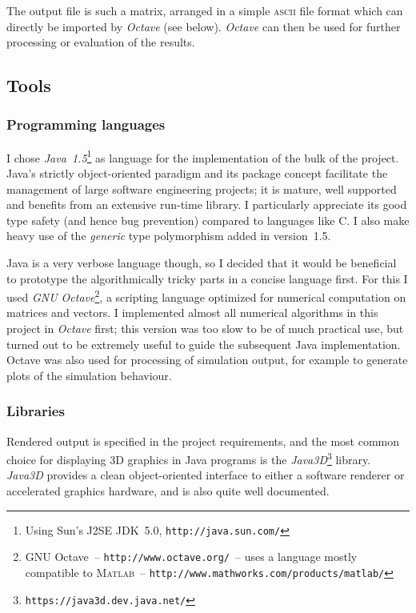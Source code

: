 The output file is such a matrix, arranged in a simple \textsc{ascii} file format which can
directly be imported by \textsl{Octave} (see below). \textsl{Octave} can then be used for further
processing or evaluation of the results.

\subsection{Tools\label{softwareTools}}
\subsubsection{Programming languages}
I chose \textsl{Java~1.5}\footnote{Using Sun's J2SE JDK~5.0, \texttt{http://java.sun.com/}}
as language for the implementation of the bulk of the project. Java's strictly object-oriented
paradigm and its package concept facilitate the management of large software engineering
projects; it is mature, well supported and benefits from an extensive run-time library. I
particularly appreciate its good type safety (and hence bug prevention) compared to languages
like C. I also make heavy use of the \emph{generic} type polymorphism added in version~1.5.

Java is a very verbose language though, so I decided that it would be beneficial to prototype
the algorithmically tricky parts in a concise language first. For this I used
\textsl{GNU Octave}\footnote{GNU Octave~-- \texttt{http://www.octave.org/}~-- uses a language
mostly compatible to \textsc{Matlab}~-- \texttt{http://www.mathworks.com/products/matlab/}},
a scripting language optimized for numerical computation on matrices and vectors. I implemented
almost all numerical algorithms in this project in \textsl{Octave} first; this version was too
slow to be of much practical use, but turned out to be extremely useful to guide the subsequent
Java implementation. Octave was also used for processing of simulation output, for example to
generate plots of the simulation behaviour.

\subsubsection{Libraries}
Rendered output is specified in the project requirements, and the most common choice for
displaying 3D graphics in Java programs is the
\textsl{Java3D}\footnote{\texttt{https://java3d.dev.java.net/}} library. \textsl{Java3D} provides
a clean object-oriented interface to either a software renderer or accelerated graphics hardware,
and is also quite well documented.

